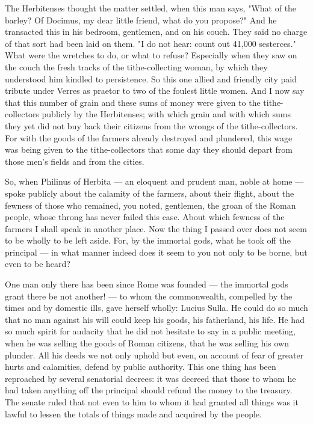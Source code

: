  The Herbitenses thought the matter settled, when this man says, "What of the barley? Of Docimus, my dear little friend, what do you propose?" And he transacted this in his bedroom, gentlemen, and on his couch. They said no charge of that sort had been laid on them. "I do not hear: count out 41,000 sesterces." What were the wretches to do, or what to refuse? Especially when they saw on the couch the fresh tracks of the tithe-collecting woman, by which they understood him kindled to persistence. So this one allied and friendly city paid tribute under Verres as praetor to two of the foulest little women. And I now say that this number of grain and these sums of money were given to the tithe-collectors publicly by the Herbitenses; with which grain and with which sums they yet did not buy back their citizens from the wrongs of the tithe-collectors. For with the goods of the farmers already destroyed and plundered, this wage was being given to the tithe-collectors that some day they should depart from those men's fields and from the cities.

 So, when Philinus of Herbita --- an eloquent and prudent man, noble at home --- spoke publicly about the calamity of the farmers, about their flight, about the fewness of those who remained, you noted, gentlemen, the groan of the Roman people, whose throng has never failed this case. About which fewness of the farmers I shall speak in another place. Now the thing I passed over does not seem to be wholly to be left aside. For, by the immortal gods, what he took off the principal --- in what manner indeed does it seem to you not only to be borne, but even to be heard?

 One man only there has been since Rome was founded --- the immortal gods grant there be not another! --- to whom the commonwealth, compelled by the times and by domestic ills, gave herself wholly: Lucius Sulla. He could do so much that no man against his will could keep his goods, his fatherland, his life. He had so much spirit for audacity that he did not hesitate to say in a public meeting, when he was selling the goods of Roman citizens, that he was selling his own plunder. All his deeds we not only uphold but even, on account of fear of greater hurts and calamities, defend by public authority. This one thing has been reproached by several senatorial decrees: it was decreed that those to whom he had taken anything off the principal should refund the money to the treasury. The senate ruled that not even to him to whom it had granted all things was it lawful to lessen the totals of things made and acquired by the people.

